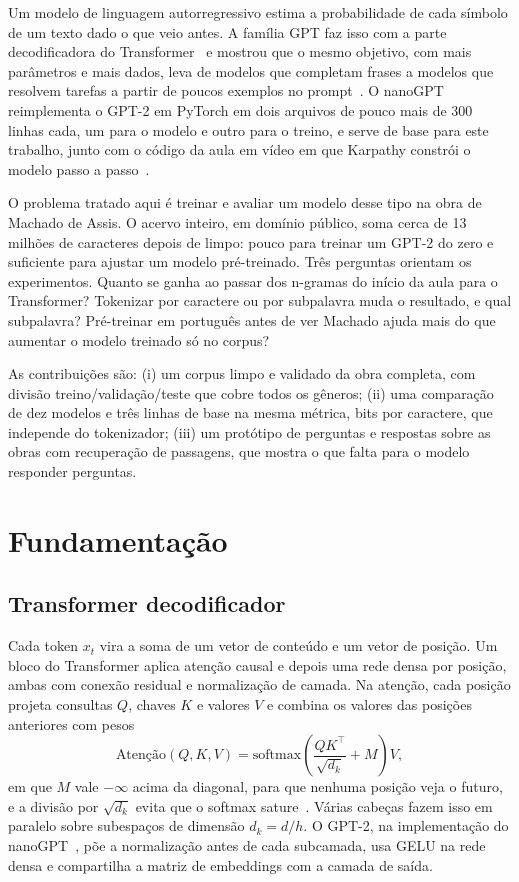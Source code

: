 \documentclass[conference]{IEEEtran}
\begin{document}
Um modelo de linguagem autorregressivo estima a probabilidade de cada símbolo de um texto dado o que veio antes. A família GPT faz isso com a parte decodificadora do Transformer~\cite{vaswani2017attention} e mostrou que o mesmo objetivo, com mais parâmetros e mais dados, leva de modelos que completam frases a modelos que resolvem tarefas a partir de poucos exemplos no prompt~\cite{brown2020gpt3}. O nanoGPT~\cite{karpathy2022nanogpt} reimplementa o GPT-2 em PyTorch em dois arquivos de pouco mais de 300 linhas cada, um para o modelo e outro para o treino, e serve de base para este trabalho, junto com o código da aula em vídeo em que Karpathy constrói o modelo passo a passo~\cite{karpathy2023video}.

O problema tratado aqui é treinar e avaliar um modelo desse tipo na obra de Machado de Assis. O acervo inteiro, em domínio público, soma cerca de 13 milhões de caracteres depois de limpo: pouco para treinar um GPT-2 do zero e suficiente para ajustar um modelo pré-treinado. Três perguntas orientam os experimentos. Quanto se ganha ao passar dos n-gramas do início da aula para o Transformer? Tokenizar por caractere ou por subpalavra muda o resultado, e qual subpalavra? Pré-treinar em português antes de ver Machado ajuda mais do que aumentar o modelo treinado só no corpus?

As contribuições são: (i) um corpus limpo e validado da obra completa, com divisão treino/validação/teste que cobre todos os gêneros; (ii) uma comparação de dez modelos e três linhas de base na mesma métrica, bits por caractere, que independe do tokenizador; (iii) um protótipo de perguntas e respostas sobre as obras com recuperação de passagens, que mostra o que falta para o modelo responder perguntas.

\section{Fundamentação}

\subsection{Transformer decodificador}

Cada token $x_t$ vira a soma de um vetor de conteúdo e um vetor de posição. Um bloco do Transformer aplica atenção causal e depois uma rede densa por posição, ambas com conexão residual e normalização de camada. Na atenção, cada posição projeta consultas $Q$, chaves $K$ e valores $V$ e combina os valores das posições anteriores com pesos
\begin{equation}
\text{Atenção}(Q,K,V)=\mathrm{softmax}\!\left(\frac{QK^\top}{\sqrt{d_k}}+M\right)V,
\end{equation}
em que $M$ vale $-\infty$ acima da diagonal, para que nenhuma posição veja o futuro, e a divisão por $\sqrt{d_k}$ evita que o softmax sature~\cite{vaswani2017attention}. Várias cabeças fazem isso em paralelo sobre subespaços de dimensão $d_k=d/h$. O GPT-2, na implementação do nanoGPT~\cite{karpathy2022nanogpt}, põe a normalização antes de cada subcamada, usa GELU na rede densa e compartilha a matriz de embeddings com a camada de saída.
\end{document}
